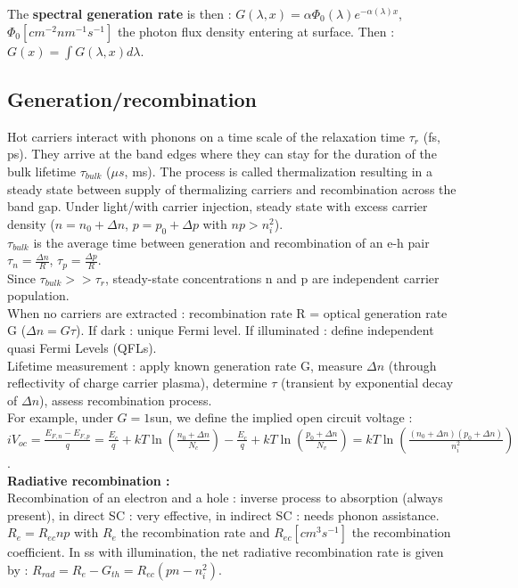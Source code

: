 \documentclass[../main.tex]{subfiles}
\begin{document}
The \textbf{spectral generation rate} is then : $G(\lambda,x) = \alpha \Phi_0(\lambda) e^{-\alpha(\lambda)x}$, $\Phi_0 [cm^{-2}nm^{-1}s^{-1}]$ the photon flux density entering at surface. Then : $G(x) = \int G(\lambda,x)d\lambda$.\\

\subsection{Generation/recombination}
Hot carriers interact with phonons on a time scale of the relaxation time $\tau_r$ (fs, ps). They arrive at the band edges where they can stay for the duration of the bulk lifetime $\tau_{bulk}$ ($\mu s$, ms). The process is called thermalization resulting in a steady state between supply of thermalizing carriers and recombination across the band gap. Under light/with carrier injection, steady state  with excess carrier density ($n = n_0 + \Delta n$, $p=p_0+\Delta p$ with $np>n_i^2$). \\
$\tau_{bulk}$ is the average time between generation and recombination of an e-h pair $\tau_n = \frac{\Delta n}{R}$, $\tau_p = \frac{\Delta p}{R}$.\\
Since $\tau_{bulk} >> \tau_r$, steady-state concentrations n and p are independent carrier population. \\
When no carriers are extracted : recombination rate R = optical generation rate G ($\Delta n = G\tau$). If dark : unique Fermi level. If illuminated : define independent quasi Fermi Levels (QFLs). \\

Lifetime measurement : apply known generation rate G, measure $\Delta n$ (through reflectivity of charge carrier plasma), determine $\tau$ (transient by exponential decay of $\Delta n$), assess recombination process.\\

For example, under $G=1$sun, we define the implied open circuit voltage : $iV_{oc} = \frac{E_{F,n} - E_{F,p}}{q} = \frac{E_c}{q} + kT \ln(\frac{n_0+\Delta n}{N_c}) - \frac{E_c}{q} + kT \ln(\frac{p_0+\Delta n}{N_v}) = kT \ln(\frac{(n_0+\Delta n)(p_0+\Delta n)}{n_i^2})$.\\

\textbf{Radiative recombination :}\\
Recombination of an electron and a hole : inverse process to absorption (always present), in direct SC : very effective, in indirect SC : needs phonon assistance. $R_e = R_{ec} np$ with $R_e$ the recombination rate and $R_{ec} [cm^{3} s^{-1}]$ the recombination coefficient. In ss with illumination, the net radiative recombination rate is given by : $R_{rad} = R_e - G_{th} = R_{ec} (pn-n_i^2)$.\\
\end{document}
